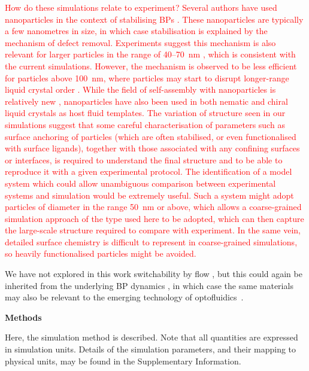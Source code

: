 \documentclass[12pt]{article}
\begin{document}
\textcolor{red}{
How do these simulations relate to experiment? Several authors have
used nanoparticles in the context of stabilising BPs
\cite{yoshida2009,karatairi}. These
nanoparticles are typically a few nanometres in size, in which case
stabilisation is explained by the mechanism of defect removal.
Experiments suggest this mechanism is also
relevant for larger particles in the range of 40--70~nm 
\cite{dierking}, which is consistent with the current simulations.
However, the mechanism is observed to be less efficient for
particles above 100~nm, where particles may start to disrupt
longer-range liquid crystal order \cite{dierking}. While the field of
self-assembly with nanoparticles is relatively new \cite{draper},
nanoparticles have also been used in both nematic \cite{milette2012}
and chiral liquid crystals \cite{cordoyiannis} as host fluid templates.
The variation of structure seen
in our simulations suggest that some careful characterisation of parameters
such as surface anchoring of particles (which are often stabilised, or even
functionalised with surface ligands), together with those associated
with any confining surfaces or interfaces, is required to understand the
final structure and to be able to reproduce it with a given experimental
protocol. The identification of a model system which could allow
unambiguous comparison between experimental systems and simulation
would be extremely useful. Such a system might adopt particles of
diameter in the range 50~nm or above, which allows a coarse-grained simulation
approach of the type used here to be adopted, which can then capture the
large-scale structure required to compare with experiment. In the same vein,
detailed surface chemistry is difficult to represent in coarse-grained
simulations, so heavily functionalised particles might be avoided.
}

We have not explored in this work switchability by flow \cite{flowswitch}, but this could again be inherited from the underlying BP dynamics \cite{adriano,permeation2}, in which case the same materials may also be relevant to the emerging technology of optofluidics~\cite{optofluidics}.


\bigskip
\noindent
\textbf{\large Methods}

Here, the simulation method is described. Note that
all quantities are expressed in simulation units. Details
of the simulation parameters, and their mapping to physical units,
may be found in the Supplementary Information.
\end{document}
